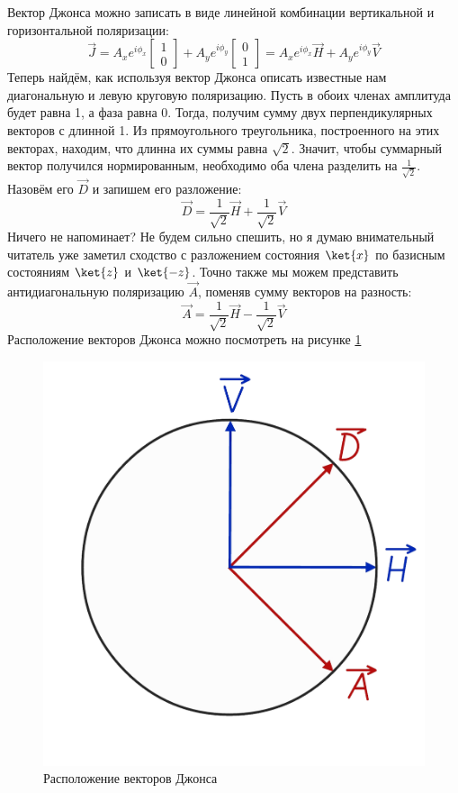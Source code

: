 Вектор Джонса можно записать в виде линейной комбинации вертикальной и горизонтальной поляризации:
\[
\Vec{J} = A_x e^{i\phi_x}\begin{bmatrix} 1 \\ 0 \end{bmatrix} + A_y e^{i\phi_y}\begin{bmatrix} 0 \\ 1 \end{bmatrix} = A_x e^{i\phi_x}\Vec{H} + A_y e^{i\phi_y}\Vec{V}
\]
Теперь найдём, как используя вектор Джонса описать известные нам диагональную и левую круговую поляризацию. Пусть в обоих членах амплитуда будет равна 1, а фаза равна 0. Тогда, получим сумму двух перпендикулярных векторов с длинной 1. Из прямоугольного треугольника, построенного на этих векторах, находим, что длинна их суммы равна $\sqrt{2}$. Значит, чтобы суммарный вектор получился нормированным, необходимо оба члена разделить на $\frac{1}{\sqrt{2}}$. Назовём его $\Vec{D}$ и запишем его разложение:
\[
\Vec{D} = \frac{1}{\sqrt{2}}\Vec{H} + \frac{1}{\sqrt{2}}\Vec{V}
\]
Ничего не напоминает? Не будем сильно спешить, но я думаю внимательный читатель уже заметил сходство с разложением состояния $\ket{x}$ по базисным состояниям $\ket{z}$ и $\ket{-z}$. Точно также мы можем представить антидиагональную поляризацию $\Vec{A}$, поменяв сумму векторов на разность:
\[
\Vec{A} = \frac{1}{\sqrt{2}}\Vec{H} - \frac{1}{\sqrt{2}}\Vec{V}
\]
Расположение векторов Джонса можно посмотреть на рисунке \ref{fig B.5}
\begin{figure}[h!]
\centering
\includegraphics[scale=0.23]{appendix/images/pol phys space.png}
\caption{Расположение векторов Джонса}
\label{fig B.5}
\end{figure}

